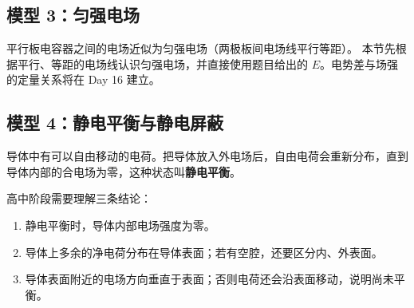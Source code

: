 \begin{center}


\label{fig:equal-like-field-lines}

\vspace{0.4em}


\label{fig:equal-like-bisector-field}
\end{center}

\subsection*{模型 3：匀强电场}

平行板电容器之间的电场近似为匀强电场（两极板间电场线平行等距）。
本节先根据平行、等距的电场线认识匀强电场，并直接使用题目给出的
$E$。电势差与场强的定量关系将在 Day 16 建立。

\begin{center}


\label{fig:parallel-plate-field-lines}
\end{center}

\subsection*{模型 4：静电平衡与静电屏蔽}

导体中有可以自由移动的电荷。把导体放入外电场后，自由电荷会重新分布，直到导体内部的合电场为零，这种状态叫\textbf{静电平衡}。

\begin{center}


\label{fig:electrostatic-shielding}
\end{center}

高中阶段需要理解三条结论：
\begin{enumerate}
  \item 静电平衡时，导体内部电场强度为零。
  \item 导体上多余的净电荷分布在导体表面；若有空腔，还要区分内、外表面。
  \item 导体表面附近的电场方向垂直于表面；否则电荷还会沿表面移动，说明尚未平衡。
\end{enumerate}

